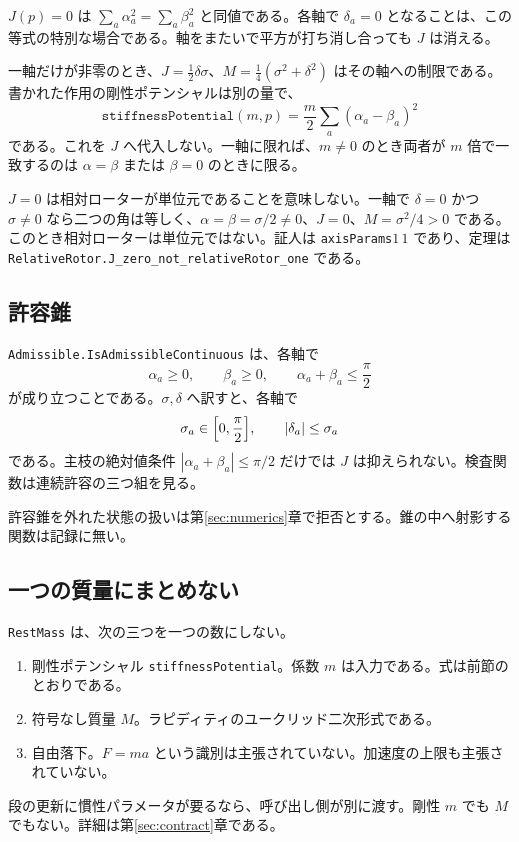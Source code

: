 \(J(p)=0\) は \(\sum_a\alpha_a^2=\sum_a\beta_a^2\) と同値である。各軸で \(\delta_a=0\) となることは、この等式の特別な場合である。軸をまたいで平方が打ち消し合っても \(J\) は消える。

一軸だけが非零のとき、\(J=\frac12\delta\sigma\)、\(M=\frac14(\sigma^2+\delta^2)\) はその軸への制限である。書かれた作用の剛性ポテンシャルは別の量で、
\[
\texttt{stiffnessPotential}(m,p)=\frac m2\sum_a(\alpha_a-\beta_a)^2
\]
である。これを \(J\) へ代入しない。一軸に限れば、\(m\neq 0\) のとき両者が \(m\) 倍で一致するのは \(\alpha=\beta\) または \(\beta=0\) のときに限る。

\(J=0\) は相対ローターが単位元であることを意味しない。一軸で \(\delta=0\) かつ \(\sigma\neq 0\) なら二つの角は等しく、\(\alpha=\beta=\sigma/2\neq 0\)、\(J=0\)、\(M=\sigma^2/4>0\) である。このとき相対ローターは単位元ではない。証人は \texttt{axisParams}\(1\,1\) であり、定理は \texttt{RelativeRotor.J\_zero\_not\_relativeRotor\_one} である。

\subsection{許容錐}

\texttt{Admissible.IsAdmissibleContinuous} は、各軸で
\[
\alpha_a\ge 0,\qquad \beta_a\ge 0,\qquad \alpha_a+\beta_a\le\frac\pi2
\]
が成り立つことである。\(\sigma,\delta\) へ訳すと、各軸で
\[
\sigma_a\in\Bigl[0,\frac\pi2\Bigr],\qquad |\delta_a|\le\sigma_a
\]
である。主枝の絶対値条件 \(|\alpha_a+\beta_a|\le\pi/2\) だけでは \(J\) は抑えられない。検査関数は連続許容の三つ組を見る。

許容錐を外れた状態の扱いは第\ref{sec:numerics}章で拒否とする。錐の中へ射影する関数は記録に無い。

\subsection{一つの質量にまとめない}

\texttt{RestMass} は、次の三つを一つの数にしない。

\begin{enumerate}
\item 剛性ポテンシャル \texttt{stiffnessPotential}。係数 \(m\) は入力である。式は前節のとおりである。
\item 符号なし質量 \(M\)。ラピディティのユークリッド二次形式である。
\item 自由落下。\(F=ma\) という識別は主張されていない。加速度の上限も主張されていない。
\end{enumerate}

段の更新に慣性パラメータが要るなら、呼び出し側が別に渡す。剛性 \(m\) でも \(M\) でもない。詳細は第\ref{sec:contract}章である。
